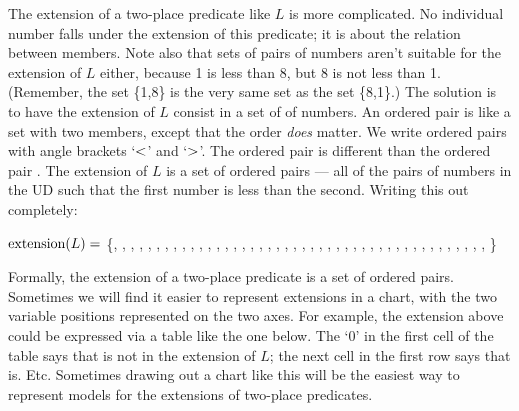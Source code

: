 The extension of a two-place predicate like $L$ is more complicated. No individual number falls under the extension of this predicate; it is about the relation between members. Note also that sets of pairs of numbers aren't suitable for the extension of $L$ either, because 1 is less than 8, but 8 is not less than 1. (Remember, the set \{1,8\} is the very same set as the set \{8,1\}.) The solution is to have the extension of $L$ consist in a set of  of numbers. An ordered pair is like a set with two members, except that the order \emph{does} matter. We write ordered pairs with angle brackets `$<$' and `$>$'. The ordered pair \mbox{} is different than the ordered pair \mbox{}. The extension of $L$ is a set of ordered pairs --- all of the pairs of numbers in the UD such that the first number is less than the second. Writing this out completely:


$\mbox{extension}(L)=$ \{, , , , , , , , ,
, , , , , , , ,
, , , , , , ,
, , , , , ,
, , , , ,
, , , , 
, , ,
, ,
%
\}

Formally, the extension of a two-place predicate is a set of ordered pairs. Sometimes we will find it easier to represent extensions in a chart, with the two variable positions represented on the two axes. For example, the extension above could be expressed via a table like the one below. The `0' in the first cell of the table says that  is not in the extension of $L$; the next cell in the first row says that  is. Etc. Sometimes drawing out a chart like this will be the easiest way to represent models for the extensions of two-place predicates.


